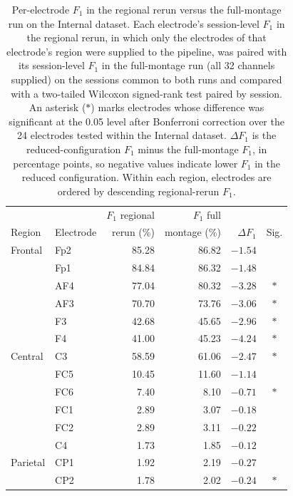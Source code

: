 \documentclass[journal,twoside,web]{ieeecolor}
\begin{document}
\begin{table}[htbp]
  \centering
  \renewcommand{\baselinestretch}{1}\normalsize
  \caption{Per-electrode $F_1$ in the regional rerun versus the full-montage run on the Internal dataset. Each electrode's session-level $F_1$ in the regional rerun, in which only the electrodes of that electrode's region were supplied to the pipeline, was paired with its session-level $F_1$ in the full-montage run (all 32 channels supplied) on the sessions common to both runs and compared with a two-tailed Wilcoxon signed-rank test paired by session. An asterisk ($*$) marks electrodes whose difference was significant at the 0.05 level after Bonferroni correction over the 24 electrodes tested within the Internal dataset. $\Delta F_1$ is the reduced-configuration $F_1$ minus the full-montage $F_1$, in percentage points, so negative values indicate lower $F_1$ in the reduced configuration. Within each region, electrodes are ordered by descending regional-rerun $F_1$.}
  \label{tab:app_regional_internal}
  \footnotesize
  \setlength{\tabcolsep}{2.5pt}
  \begin{tabular}{@{}llrrrc@{}}
    \toprule
     &  & $F_1$ regional & $F_1$ full &  & \\
    Region & Electrode & rerun (\%) & montage (\%) & $\Delta F_1$ & Sig. \\
    \midrule
    Frontal & Fp2 & 85.28 & 86.82 & $-1.54$ & \\
     & Fp1 & 84.84 & 86.32 & $-1.48$ & \\
     & AF4 & 77.04 & 80.32 & $-3.28$ & $*$ \\
     & AF3 & 70.70 & 73.76 & $-3.06$ & $*$ \\
     & F3 & 42.68 & 45.65 & $-2.96$ & $*$ \\
     & F4 & 41.00 & 45.23 & $-4.24$ & $*$ \\
    \addlinespace
    Central & C3 & 58.59 & 61.06 & $-2.47$ & $*$ \\
     & FC5 & 10.45 & 11.60 & $-1.14$ & \\
     & FC6 & 7.40 & 8.10 & $-0.71$ & $*$ \\
     & FC1 & 2.89 & 3.07 & $-0.18$ & \\
     & FC2 & 2.89 & 3.11 & $-0.22$ & \\
     & C4 & 1.73 & 1.85 & $-0.12$ & \\
    \addlinespace
    Parietal & CP1 & 1.92 & 2.19 & $-0.27$ & \\
     & CP2 & 1.78 & 2.02 & $-0.24$ & $*$ \\

\end{tabular}
\end{table}
\end{document}

